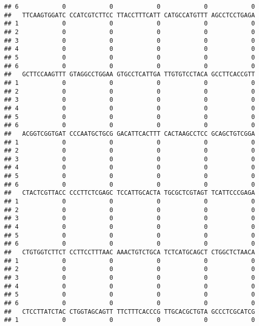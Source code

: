 \documentclass[]{article}
\begin{document}
\begin{verbatim}
## 6            0            0            0            0            0
##   TTCAAGTGGATC CCATCGTCTTCC TTACCTTTCATT CATGCCATGTTT AGCCTCCTGAGA
## 1            0            0            0            0            0
## 2            0            0            0            0            0
## 3            0            0            0            0            0
## 4            0            0            0            0            0
## 5            0            0            0            0            0
## 6            0            0            0            0            0
##   GCTTCCAAGTTT GTAGGCCTGGAA GTGCCTCATTGA TTGTGTCCTACA GCCTTCACCGTT
## 1            0            0            0            0            0
## 2            0            0            0            0            0
## 3            0            0            0            0            0
## 4            0            0            0            0            0
## 5            0            0            0            0            0
## 6            0            0            0            0            0
##   ACGGTCGGTGAT CCCAATGCTGCG GACATTCACTTT CACTAAGCCTCC GCAGCTGTCGGA
## 1            0            0            0            0            0
## 2            0            0            0            0            0
## 3            0            0            0            0            0
## 4            0            0            0            0            0
## 5            0            0            0            0            0
## 6            0            0            0            0            0
##   CTACTCGTTACC CCCTTCTCGAGC TCCATTGCACTA TGCGCTCGTAGT TCATTCCCGAGA
## 1            0            0            0            0            0
## 2            0            0            0            0            0
## 3            0            0            0            0            0
## 4            0            0            0            0            0
## 5            0            0            0            0            0
## 6            0            0            0            0            0
##   CTGTGGTCTTCT CCTTCCTTTAAC AAACTGTCTGCA TCTCATGCAGCT CTGGCTCTAACA
## 1            0            0            0            0            0
## 2            0            0            0            0            0
## 3            0            0            0            0            0
## 4            0            0            0            0            0
## 5            0            0            0            0            0
## 6            0            0            0            0            0
##   CTCCTTATCTAC CTGGTAGCAGTT TTCTTTCACCCG TTGCACGCTGTA GCCCTCGCATCG
## 1            0            0            0            0            0

\end{verbatim}
\end{document}
